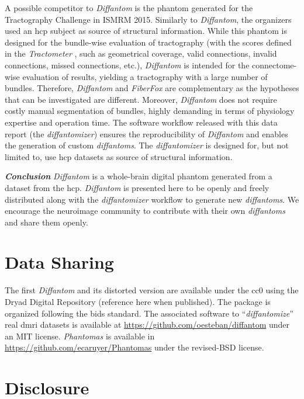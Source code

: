 \documentclass[english]{frontiers/frontiersSCNS} %
\begin{document}
A possible competitor to \emph{Diffantom} is the phantom generated for the Tractography Challenge in
  ISMRM 2015.
Similarly to \emph{Diffantom}, the organizers used an \gls*{hcp} subject as source of structural information.
While this phantom is designed for the bundle-wise evaluation of tractography (with the scores defined in the
  \emph{Tractometer} \citep{cote_tractometer_2013}, such as geometrical coverage, valid connections, invalid connections,
  missed connections, etc.), \emph{Diffantom} is intended for the connectome-wise evaluation of results,
  yielding a tractography with a large number of bundles.
Therefore, \emph{Diffantom} and \emph{FiberFox} are complementary as the hypotheses that can be investigated are different.
Moreover, \emph{Diffantom} does not require costly manual segmentation of bundles, highly demanding in terms of physiology
  expertise and operation time.
The software workflow released with this data report (the \emph{diffantomizer}) ensures the reproducibility of
  \emph{Diffantom} and enables the generation of custom \emph{diffantoms}.
The \emph{diffantomizer} is designed for, but not limited to, use \gls*{hcp} datasets as source of structural information.

\noindent\textbf{\textit{Conclusion\textcolon}}\label{sec:conclusion} %
\emph{Diffantom} is a whole-brain digital phantom generated from a dataset from the \acrlong*{hcp}.
\emph{Diffantom} is presented here to be openly and freely distributed along with the \emph{diffantomizer} workflow
  to generate new \emph{diffantoms}.
We encourage the neuroimage community to contribute with their own \emph{diffantoms} and share them openly.


\section*{Data Sharing}
The first \emph{Diffantom} and its distorted version are available under the \gls*{cc0} using the Dryad Digital Repository
  {\color{red} (reference here when published)}.
The package is organized following the \gls*{bids} standard.
The associated software to ``\emph{diffantomize}'' real \gls*{dmri} datasets is available at \url{https://github.com/oesteban/diffantom}
  under an MIT license.
\emph{Phantomas} is available in \url{https://github.com/ecaruyer/Phantomas} under the revised-BSD license.

\section*{Disclosure}
\end{document}
